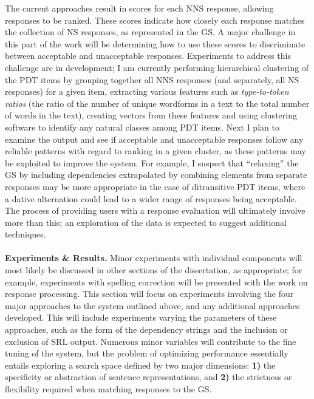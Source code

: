 The current approaches result in scores for each NNS response, allowing responses to be ranked. These scores indicate how closely each response matches the collection of NS responses, as represented in the GS. A major challenge in this part of the work will be determining how to use these scores to discriminate between acceptable and unacceptable responses. Experiments to address this challenge are in development; I am currently performing hierarchical clustering of the PDT items by grouping together all NNS responses (and separately, all NS responses) for a given item, extracting various features such as \textit{type-to-token ratios} (the ratio of the number of unique wordforms in a text to the total number of words in the text), creating vectors from these features and using clustering software to identify any natural classes among PDT items. Next I plan to examine the output and see if acceptable and unacceptable responses follow any reliable patterns with regard to ranking in a given cluster, as these patterns may be exploited to improve the system. For example, I suspect that ``relaxing'' the GS by including dependencies extrapolated by combining elements from separate responses may be more appropriate in the case of ditransitive PDT items, where a dative alternation could lead to a wider range of responses being acceptable. The process of providing users with a response evaluation will ultimately involve more than this; an exploration of the data is expected to suggest additional techniques. \\
\\
\textbf{Experiments \& Results.} %
Minor experiments with individual components will most likely be discussed in other sections of the dissertation, as appropriate; for example, experiments with spelling correction will be presented with the work on response processing. This section will focus on experiments involving the four major approaches to the system outlined above, and any additional approaches developed. This will include experiments varying the parameters of these approaches, such as the form of the dependency strings and the inclusion or exclusion of SRL output. Numerous minor variables will contribute to the fine tuning of the system, but the problem of optimizing performance essentially entails exploring a search space defined by two major dimensions: \textbf{1)} the specificity or abstraction of sentence representations, and \textbf{2)} the strictness or flexibility required when matching responses to the GS.
